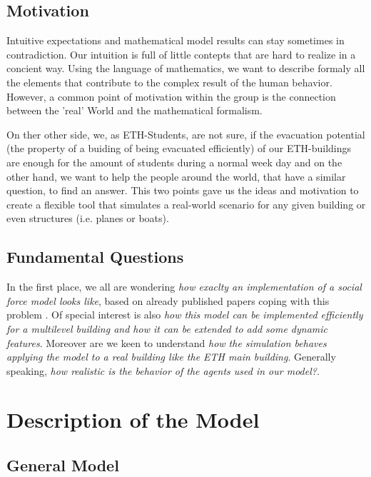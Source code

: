 \documentclass[11pt]{article}
\begin{document}
\subsection{Motivation}

Intuitive expectations and mathematical model results can stay sometimes in
contradiction. Our intuition is full of little contepts that are hard to realize in a concient way.
Using the language of mathematics, we want to describe formaly all the elements that contribute
to the complex result of the human behavior. However, a common point of motivation within the group is 
the connection between the 'real' World and the mathematical formalism.

On ther other side, we, as ETH-Students, are not sure, if the evacuation
potential (the property of a buiding of being evacuated efficiently) of our ETH-buildings are enough for the amount of students during a normal
week day and on the other hand, we want to help the people around the world,
that have a similar question, to find an answer. This two points gave us the
ideas and motivation to create a flexible tool that simulates a real-world
scenario for any given building or even structures (i.e. planes or boats).


\subsection{Fundamental Questions}

In the first place, we all are wondering \textit{how exaclty an implementation of a social force model looks like}, based on already published papers coping with this problem \cite{SFMPD} \cite{SDFEP}. Of special interest is also \textit{how this model can be implemented efficiently for a multilevel building and how it can be extended to add some dynamic features}. Moreover are we keen to understand \textit{how the simulation behaves applying the model to a real building like the ETH main building}. Generally speaking, \textit{how realistic is the behavior of the agents used in our model?}.

\section{Description of the Model}
\subsection{General Model}
\end{document}
